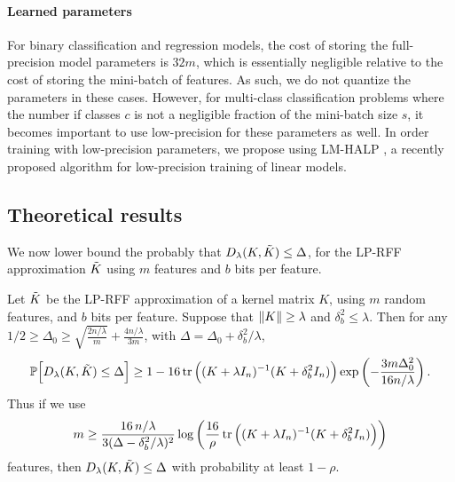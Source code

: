 \paragraph{Learned parameters} For binary classification and regression models, the cost of storing the full-precision model parameters is $32m$, which is essentially negligible relative to the cost of storing the mini-batch of features. As such, we do not quantize the parameters in these cases. However, for multi-class classification problems where the number if classes $c$ is not a negligible fraction of the mini-batch size $s$, it becomes important to use low-precision for these parameters as well. In order training with low-precision parameters, we propose using LM-HALP \citep{halp18}, a recently proposed algorithm for low-precision training of linear models.


\subsection{Theoretical results}
We now lower bound the probably that $D_{\lambda}(K,\tilde{K}) \leq \Delta$, for the LP-RFF approximation $\tilde{K}$ using $m$ features and $b$ bits per feature.

\begin{theorem}
	Let $\tilde{K}$ be the LP-RFF approximation of a kernel matrix $K$, using $m$ random features, and $b$ bits per feature. Suppose that $\|K\| \geq \lambda$ and $\delta^2_b \leq \lambda$.
	Then for any $1/2 \geq \Delta_0 \geq \sqrt{\frac{2n/\lambda}{m}} + \frac{4n/\lambda}{3m}$, with $\Delta =
	\Delta_0 + \delta^2_b / \lambda$,
	\begin{equation*}
	\mathbb{P}\Big[D_{\lambda}(K,\tilde{K}) \leq \Delta\Big] \geq 1 - 16 \mathop{\rm tr}\Big((K +
	\lambda I_n)^{-1} (K + \delta^2_b I_n)\Big) \exp \left( -\frac{3m \Delta_0^2}{16n/\lambda} \right).
	\end{equation*}
	Thus if we use 
	\begin{equation*}
	m \geq \frac{16\, n/\lambda}{3(\Delta - \delta_b^2/\lambda)^{2}} \log \bigg(\frac{16}{\rho} \mathop{\rm tr}\Big((K + \lambda I_n)^{-1} (K + \delta^2_b I_n)\Big) \bigg)
	\end{equation*}
	features, then $D_{\lambda}(K,\tilde{K}) \leq \Delta$	with probability at least $1 - \rho$.
\end{theorem}

